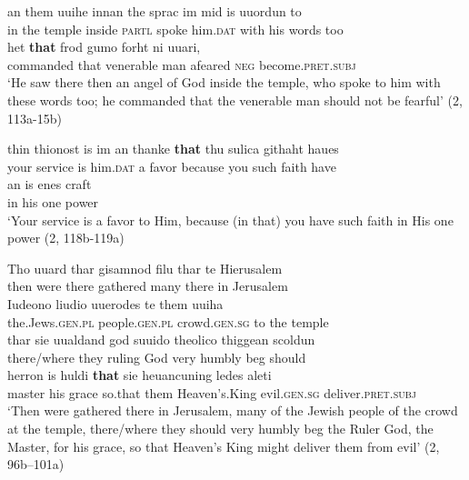 \gll an  them   uuihe  innan  the     sprac   im       mid    is   uuordun  to\\
in   the     temple   inside  \textsc{partl}   spoke   him.\textsc{dat}   with   his  words          too\\

\gll het       \textbf{that}   frod    gumo  forht   ni     uuari,\\
commanded  that   venerable   man   afeared   \textsc{neg}   become.\textsc{pret.subj}\\

\glt ‘He saw there then an angel of God  inside the temple, who spoke to him with these words too; he commanded that the venerable man should not be fearful’ (2, 113a-15b)

\ex
\gll thin    thionost  is  im       an thanke  \textbf{that}    thu  sulica   githaht  haues\\
  your  service   is   him.\textsc{dat}  a favor     because   you  such  faith   have\\

\gll an  is   enes  craft\\
in  his  one     power\\
\glt ‘Your service is a favor to Him, because (in that) you have such faith in His one power (2, 118b-119a)

\ex
\gll Tho    uuard   thar    gisamnod  filu     thar    te  Hierusalem\\
  then  were  there   gathered   many   there   in   Jerusalem\\

\gll Iudeono     liudio       uuerodes     te   them  uuiha\\
the.Jews.\textsc{gen.pl}  people.\textsc{gen.pl}  crowd.\textsc{gen.sg}  to  the    temple\\

\gll thar     sie     uualdand  god    suuido  theolico   thiggean  scoldun\\
there/where  they    ruling     God    very   humbly   beg     should\\

\gll herron   is  huldi  \textbf{that}    sie    heuancuning   ledes     aleti\\
master   his   grace  so.that   them  Heaven’s.King  evil.\textsc{gen.sg}  deliver.\textsc{pret.subj}\\

\glt ‘Then were gathered there in Jerusalem, many of the Jewish people of the crowd at the temple, there/where they should very humbly beg the Ruler God, the Master, for his grace, so that Heaven's King might deliver them from evil’ (2, 96b--101a)

